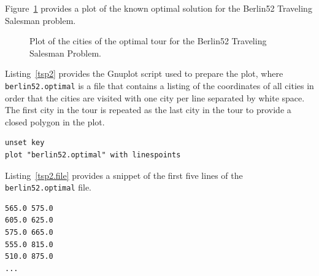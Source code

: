 Figure~\ref{plot:tsp2} provides a plot of the known optimal solution for the Berlin52 Traveling Salesman problem. 

\begin{figure}[htp]
\centering

\caption{Plot of the cities of the optimal tour for the Berlin52 Traveling Salesman Problem.}
\label{plot:tsp2}
\end{figure}

Listing~\ref{tsp2} provides the Gnuplot script used to prepare the plot, where \texttt{berlin52.optimal} is a file that contains a listing of the coordinates of all cities in order that the cities are visited with one city per line separated by white space. The first city in the tour is repeated as the last city in the tour to provide a closed polygon in the plot.

\begin{lstlisting}[caption=Gnuplot script for plotting a tour for a Traveling Salesman Problem., label=tsp2]
unset key
plot "berlin52.optimal" with linespoints
\end{lstlisting}

Listing~\ref{tsp2.file} provides a snippet of the first five lines of the \texttt{berlin52.optimal} file.

\begin{lstlisting}[caption=Snippet of the berlin52.optimal file., label=tsp2.file]
565.0 575.0
605.0 625.0
575.0 665.0
555.0 815.0
510.0 875.0
...
\end{lstlisting}
